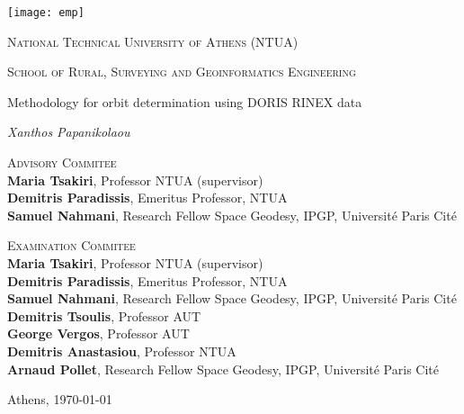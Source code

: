 \begin{center}
  \texttt{[image: emp]}\par\vspace{.8cm}
  {\Large \textsc{National Technical University of Athens (NTUA)} \par}
  {\Large \textsc{School of Rural, Surveying and Geoinformatics Engineering} \par}
  \vspace{.5cm}
  {\huge Methodology for orbit determination using DORIS RINEX data \par}
  \vspace{1cm}
  {\Large\itshape Xanthos Papanikolaou\par}
  \vfill

  \textsc{Advisory Commitee}\\
  \textbf{Maria Tsakiri}, Professor NTUA (supervisor)\\
  \textbf{Demitris Paradissis}, Emeritus Professor, NTUA \\
  \textbf{Samuel Nahmani}, Research Fellow Space Geodesy, IPGP, Université Paris Cité \par

  \textsc{Examination Commitee}\\
  \textbf{Maria Tsakiri}, Professor NTUA (supervisor)\\
  \textbf{Demitris Paradissis}, Emeritus Professor, NTUA \\
  \textbf{Samuel Nahmani}, Research Fellow Space Geodesy, IPGP, Université Paris Cité \\
  \textbf{Demitris Tsoulis}, Professor AUT \\
  \textbf{George Vergos}, Professor AUT \\
  \textbf{Demitris Anastasiou}, Professor NTUA \\
  \textbf{Arnaud Pollet}, Research Fellow Space Geodesy, IPGP, Université Paris Cité \par

  \vfill
  {\large Athens, \today\par}
\end{center}
\clearpage

